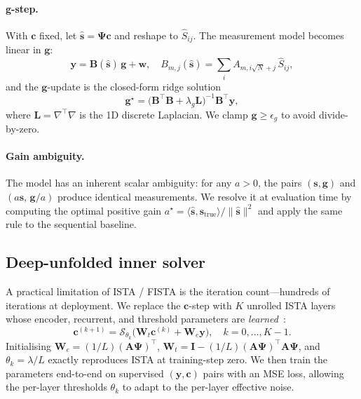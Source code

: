 \documentclass{article}
\begin{document}
\paragraph{g-step.} With $\boldsymbol{c}$ fixed, let $\hat{\boldsymbol{s}} = \boldsymbol{\Psi}\boldsymbol{c}$ and reshape to $\hat{S}_{ij}$. The measurement model becomes linear in $\boldsymbol{g}$:
\begin{equation}
  \boldsymbol{y} = \boldsymbol{B}(\hat{\boldsymbol{s}})\,\boldsymbol{g} + \boldsymbol{w},
  \quad
  B_{m,j}(\hat{\boldsymbol{s}}) = \sum_i A_{m, i \sqrt{N} + j}\, \hat{S}_{ij},
\end{equation}
and the $\boldsymbol{g}$-update is the closed-form ridge solution
\begin{equation}
  \boldsymbol{g}^\star =
  \big(\boldsymbol{B}^\top \boldsymbol{B} + \lambda_g \boldsymbol{L}\big)^{-1}
  \boldsymbol{B}^\top \boldsymbol{y},
\end{equation}
where $\boldsymbol{L} = \nabla^\top \nabla$ is the 1D discrete Laplacian. We clamp $\boldsymbol{g} \ge \epsilon_g$ to avoid divide-by-zero.

\paragraph{Gain ambiguity.} The model has an inherent scalar ambiguity: for any $a > 0$, the pairs $(\boldsymbol{s}, \boldsymbol{g})$ and $(a\boldsymbol{s},\, \boldsymbol{g}/a)$ produce identical measurements. We resolve it at evaluation time by computing the optimal positive gain $a^\star = \langle \hat{\boldsymbol{s}}, \boldsymbol{s}_\text{true} \rangle / \|\hat{\boldsymbol{s}}\|^2$ and apply the same rule to the sequential baseline.

\subsection{Deep-unfolded inner solver}

A practical limitation of ISTA / FISTA is the iteration count---hundreds of iterations at deployment. We replace the $\boldsymbol{c}$-step with $K$ unrolled ISTA layers whose encoder, recurrent, and threshold parameters are \emph{learned}~\citep{gregor2010lista}:
\begin{equation}
  \boldsymbol{c}^{(k+1)} =
  \mathcal{S}_{\theta_k}\!\big(
    \boldsymbol{W}_t \boldsymbol{c}^{(k)} + \boldsymbol{W}_e \boldsymbol{y}
  \big),\quad k=0,\dots,K-1.
  \label{eq:lista}
\end{equation}
Initialising $\boldsymbol{W}_e = (1/L)(\boldsymbol{A}\boldsymbol{\Psi})^\top$, $\boldsymbol{W}_t = \boldsymbol{I} - (1/L)(\boldsymbol{A}\boldsymbol{\Psi})^\top \boldsymbol{A}\boldsymbol{\Psi}$, and $\theta_k = \lambda/L$ exactly reproduces ISTA at training-step zero. We then train the parameters end-to-end on supervised $(\boldsymbol{y}, \boldsymbol{c})$ pairs with an MSE loss, allowing the per-layer thresholds $\theta_k$ to adapt to the per-layer effective noise.
\end{document}
